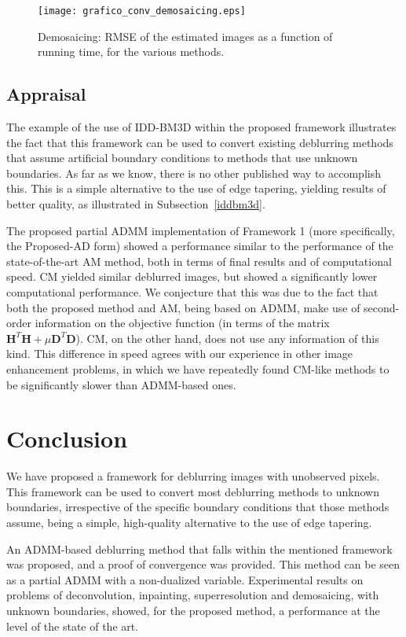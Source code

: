 \documentclass[10pt,twocolumn,twoside]{IEEEtran}
\newcommand{\Hm}{\mathbf{H}} %
\newcommand{\D}{\mathbf{D}} %
\begin{document}
\begin{figure}[!t]
	\centering
	\texttt{[image: grafico\_conv\_demosaicing.eps]}%
	\caption{Demosaicing: RMSE of the estimated images as a function of running time, for the various methods.}
	\label{fig:grafico_conv_demosaicing}
\end{figure}

\subsection{Appraisal}
\label{sec:appraisal}

The example of the use of IDD-BM3D within the proposed framework illustrates the fact that this framework can be used to convert existing deblurring methods that assume artificial boundary conditions to methods that use unknown boundaries. As far as we know, there is no other published way to accomplish this. This is a simple alternative to the use of edge tapering, yielding results of better quality, as illustrated in Subsection~\ref{iddbm3d}.

The proposed partial ADMM implementation of Framework 1 (more specifically, the Proposed-AD form) showed a performance similar to the performance of the state-of-the-art AM method, both in terms of final results and of computational speed. CM yielded similar deblurred images, but showed a significantly lower computational performance. We conjecture that this was due to the fact that both the proposed method and AM, being based on ADMM, make use of second-order information on the objective function (in terms of the matrix $\Hm^T \Hm + \mu \D^T \D$). CM, on the other hand, does not use any information of this kind. This difference in speed agrees with our experience in other image enhancement problems, in which we have repeatedly found CM-like methods to be significantly slower than ADMM-based ones.

\section{Conclusion} \label{sec:conclusion}

We have proposed a framework for deblurring images with unobserved pixels. This framework can be used to convert most deblurring methods to unknown boundaries, irrespective of the specific boundary conditions that those methods assume, being a simple, high-quality alternative to the use of edge tapering.

 An ADMM-based deblurring method that falls within the mentioned framework was proposed, and a proof of convergence was provided. This method can be seen as a partial ADMM with a non-dualized variable. Experimental results on problems of deconvolution, inpainting, superresolution and demosaicing, with unknown boundaries, showed, for the proposed method, a performance at the level of the state of the art.
\end{document}
